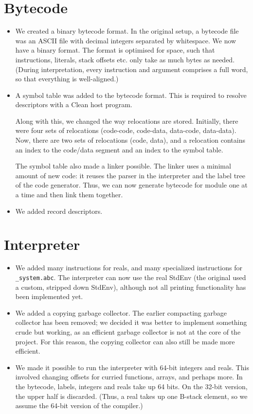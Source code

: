 \documentclass[a4paper]{article}
\begin{document}
\section*{Bytecode}
\begin{itemize}
	\item
		We created a binary bytecode format.
		In the original setup, a bytecode file was an ASCII file with decimal integers separated by whitespace.
		We now have a binary format.
		The format is optimised for space, such that instructions, literals, stack offsets etc. only take as much bytes as needed.
		(During interpretation, every instruction and argument comprises a full word, so that everything is well-aligned.)

	\item
		A symbol table was added to the bytecode format.
		This is required to resolve descriptors with a Clean host program.

		Along with this, we changed the way relocations are stored.
		Initially, there were four sets of relocations (code-code, code-data, data-code, data-data).
		Now, there are two sets of relocations (code, data), and a relocation contains an index to the code/data segment and an index to the symbol table.

		The symbol table also made a linker possible.
		The linker uses a minimal amount of new code:
			it reuses the parser in the interpreter and the label tree of the code generator.
		Thus, we can now generate bytecode for module one at a time and then link them together.

	\item
		We added record descriptors.
\end{itemize}

\section*{Interpreter}
\begin{itemize}
	\item
		We added many instructions for reals, and many specialized instructions for \texttt{\_system.abc}.
		The interpreter can now use the real StdEnv (the original used a custom, stripped down StdEnv), although not all printing functionality has been implemented yet.

	\item
		We added a copying garbage collector.
		The earlier compacting garbage collector has been removed; we decided it was better to implement something crude but working,
			as an efficient garbage collector is not at the core of the project.
		For this reason, the copying collector can also still be made more efficient.

	\item
		We made it possible to run the interpreter with 64-bit integers and reals.
		This involved changing offsets for curried functions, arrays, and perhaps more.
		In the bytecode, labels, integers and reals take up 64 bits.
		On the 32-bit version, the upper half is discarded.
		(Thus, a real takes up one B-stack element, so we assume the 64-bit version of the compiler.)
\end{itemize}
\end{document}
